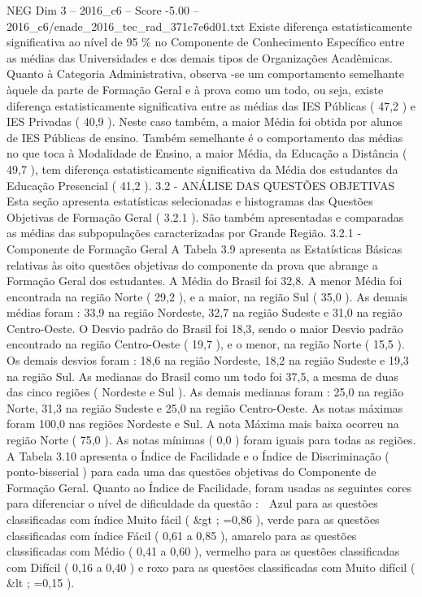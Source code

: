 \begin{textsample}{NEG Dim 3 – 2016\_c6 – Score -5.00 – 2016\_c6/enade\_2016\_tec\_rad\_371c7e6d01.txt}
Existe diferença estatisticamente significativa ao nível de 95 \% no Componente de Conhecimento Específico entre as médias das Universidades e dos demais tipos de Organizações Acadêmicas.
Quanto à Categoria Administrativa, observa -se um comportamento semelhante àquele da parte de Formação Geral e à prova como um todo, ou seja, existe diferença estatisticamente significativa entre as médias das IES Públicas ( 47,2 ) e IES Privadas ( 40,9 ).
Neste caso também, a maior Média foi obtida por alunos de IES Públicas de ensino.
Também semelhante é o comportamento das médias no que toca à Modalidade de Ensino, a maior Média, da Educação a Distância ( 49,7 ), tem diferença estatisticamente significativa da Média dos estudantes da Educação Presencial ( 41,2 ). 3.2 - ANÁLISE DAS QUESTÕES OBJETIVAS Esta seção apresenta estatísticas selecionadas e histogramas das Questões Objetivas de Formação Geral ( 3.2.1 ).
São também apresentadas e comparadas as médias das subpopulações caracterizadas por Grande Região. 3.2.1 - Componente de Formação Geral A Tabela 3.9 apresenta as Estatísticas Básicas relativas às oito questões objetivas do componente da prova que abrange a Formação Geral dos estudantes.
A Média do Brasil foi 32,8.
A menor Média foi encontrada na região Norte ( 29,2 ), e a maior, na região Sul ( 35,0 ).
As demais médias foram : 33,9 na região Nordeste, 32,7 na região Sudeste e 31,0 na região Centro-Oeste.
O Desvio padrão do Brasil foi 18,3, sendo o maior Desvio padrão encontrado na região Centro-Oeste ( 19,7 ), e o menor, na região Norte ( 15,5 ).
Os demais desvios foram : 18,6 na região Nordeste, 18,2 na região Sudeste e 19,3 na região Sul.
As medianas do Brasil como um todo foi 37,5, a mesma de duas das cinco regiões ( Nordeste e Sul ).
As demais medianas foram : 25,0 na região Norte, 31,3 na região Sudeste e 25,0 na região Centro-Oeste.
As notas máximas foram 100,0 nas regiões Nordeste e Sul.
A nota Máxima mais baixa ocorreu na região Norte ( 75,0 ).
As notas mínimas ( 0,0 ) foram iguais para todas as regiões.
A Tabela 3.10 apresenta o Índice de Facilidade e o Índice de Discriminação ( ponto-bisserial ) para cada uma das questões objetivas do Componente de Formação Geral.
Quanto ao Índice de Facilidade, foram usadas as seguintes cores para diferenciar o nível de dificuldade da questão :  Azul para as questões classificadas com índice Muito fácil ( \&gt ; =0,86 ), verde para as questões classificadas com índice Fácil ( 0,61 a 0,85 ), amarelo para as questões classificadas com Médio ( 0,41 a 0,60 ), vermelho para as questões classificadas com Difícil ( 0,16 a 0,40 ) e roxo para as questões classificadas com Muito difícil ( \&lt ; =0,15 ).

\end{textsample}
